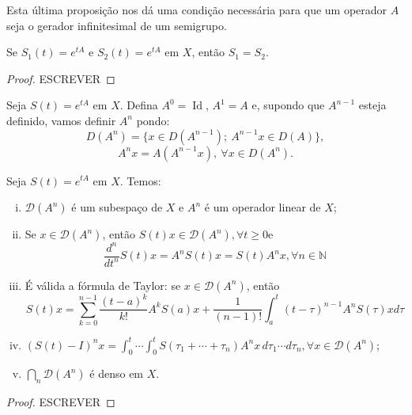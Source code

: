 \begin{remark}
    Esta última proposição nos dá uma condição necessária para que um operador $A$ seja o gerador infinitesimal de um semigrupo.
\end{remark}

\begin{proposition}[Unicidade]
    Se $S_1(t)=e^{tA}$ e $S_2(t)=e^{tA}$ em $X$, então $S_1=S_2$.
\end{proposition}
\begin{proof}
    {\color{red} ESCREVER}
\end{proof}

\begin{definition}
    Seja $S(t)=e^{tA}$ em $X$. Defina $A^0=\operatorname{Id}$, $A^1=A$ e, supondo que $A^{n-1}$ esteja definido, vamos definir $A^n$ pondo:
\[D(A^n)=\{x\in D(A^{n-1});\ A^{n-1}x\in D(A)\},\]
\[A^nx=A(A^{n-1}x), \ \forall x\in D(A^{n}).\]
\end{definition}

\begin{proposition}
Seja $S(t)=e^{tA}$ em $X$. Temos:

\begin{enumerate}[(i)]
 \item $\mathcal{D}\left(A^n\right)$ é um subespaço de $X$ e $A^n$ é um operador linear de $X$;

 \item Se $x \in \mathcal{D}\left(A^n\right)$, então $S(t) x \in \mathcal{D}\left(A^n\right), \forall t \geq 0 \mathrm{e}$
\[
\frac{d^n}{d t^n} S(t) x=A^n S(t) x=S(t) A^n x, \forall n \in \mathbb{N}
\]
\item É válida a fórmula de Taylor: se $x \in \mathcal{D}\left(A^n\right)$, então
\[
S(t) x=\sum_{k=0}^{n-1} \frac{(t-a)^k}{k!} A^k S(a) x+\frac{1}{(n-1)!} \int_a^t(t-\tau)^{n-1} A^n S(\tau) x d \tau
\]
\item  $(S(t)-I)^n x=\int_0^t \cdots \int_0^t S\left(\tau_1+\cdots+\tau_n\right) A^n x\, d \tau_1 \cdots d \tau_n, \forall x \in \mathcal{D}\left(A^n\right)$;
\item $\displaystyle\bigcap_n \mathcal{D}\left(A^n\right)$ é denso em $X$.
\end{enumerate}
\end{proposition}

\begin{proof}
    {\color{red} ESCREVER}
\end{proof}